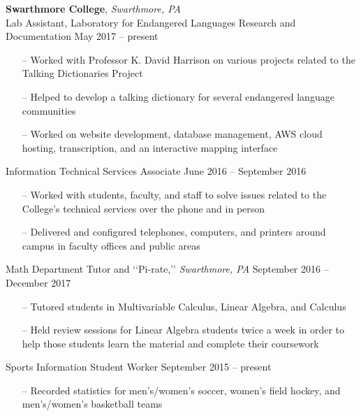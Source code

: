 \documentclass[paper=a4, fontsize=11pt]{scrartcl} %
\newcommand{\I}{--}
\begin{document}
\vspace{1mm}

\textbf{Swarthmore College}, \textit{Swarthmore, PA} \\
Lab Assistant, Laboratory for Endangered Languages Research and Documentation \hfill May 2017 -- present
\begin{itemize}[topsep=0pt,noitemsep]
	\item[\I] Worked with Professor K. David Harrison on various projects related to the Talking Dictionaries Project
	\item[\I] Helped to develop a talking dictionary for several endangered language communities
	\item[\I] Worked on website development, database management, AWS cloud hosting, transcription, and an interactive mapping interface
\end{itemize}

Information Technical Services Associate \hfill June 2016 -- September 2016
\begin{itemize}[topsep=0pt,noitemsep]
	\item[\I] Worked with students, faculty, and staff to solve issues related to the College's technical services over the phone and in person
  \item[\I] Delivered and configured telephones, computers, and printers around campus in faculty offices and public areas
\end{itemize}

Math Department Tutor and \lq\lq{Pi-rate,}\rq\rq{ }\textit{Swarthmore, PA} \hfill September 2016 -- December 2017
\begin{itemize}[topsep=0pt,noitemsep]
	\item[\I] Tutored students in Multivariable Calculus, Linear Algebra, and Calculus
	\item[\I] Held review sessions for Linear Algebra students twice a week in order to help those students learn the material and complete their coursework
\end{itemize}

Sports Information Student Worker \hfill September 2015 -- present
\begin{itemize}[topsep=0pt,noitemsep]
	\item[\I] Recorded statistics for men's/women's soccer, women's field hockey, and men's/women's basketball teams
\end{itemize}

\vspace{2mm}
\end{document}
